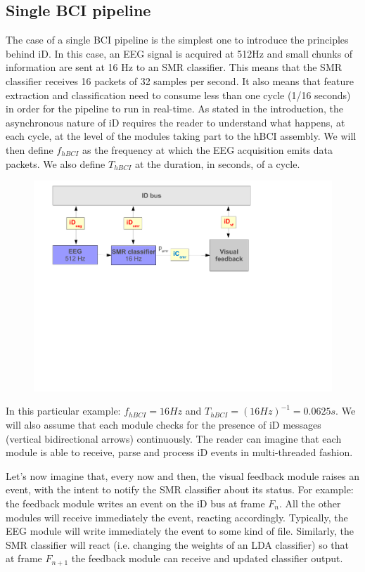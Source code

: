 \documentclass[a4paper,10pt]{article}
\begin{document}
\subsection{Single BCI pipeline}
The case of a single BCI pipeline is the simplest one to introduce the
principles behind iD. 
In this case, an EEG signal is acquired at 512Hz and small chunks of information
are sent at 16 Hz to an SMR classifier.
This means that the SMR classifier receives 16 packets of 32 samples per second.
It also means that feature extraction and classification need to consume less
than one cycle (1/16 seconds) in order for the pipeline to run in real-time.
As stated in the introduction, the asynchronous nature of iD requires the reader
to understand what happens, at each cycle, at the level of the modules taking
part to the hBCI assembly.
We will then define $f_{hBCI}$ as the frequency at which the EEG acquisition
emits data packets. We also define $T_{hBCI}$ at the duration, in seconds, of a
cycle. 
\label{sec:hbci:single}
\begin{figure}[!h]
  \begin{center}
	\includegraphics[width=\textwidth]{figures/example1.pdf}
	\caption{}
	\label{fig:hbci:single}
  \end{center}
\end{figure}
In this particular example: 
$f_{hBCI} = 16 Hz$ and $T_{hBCI} = (16 Hz)^{-1} = 0.0625 s$.
We will also assume that each module checks for the presence of iD messages
(vertical bidirectional arrows) continuously. The reader can imagine that each
module is able to receive, parse and process iD events in multi-threaded
fashion.

Let's now imagine that, every now and then, the visual feedback module raises an
event, with the intent to notify the SMR classifier about its status. 
For example: the feedback module writes an event on the iD bus at frame $F_n$.
All the other modules will receive immediately the event, reacting accordingly.
Typically, the EEG module will write immediately the event to some kind of file.
Similarly, the SMR classifier will react (i.e. changing the weights of an LDA
classifier) so that at frame $F_{n+1}$ the feedback module can receive and
updated classifier output.
\end{document}
